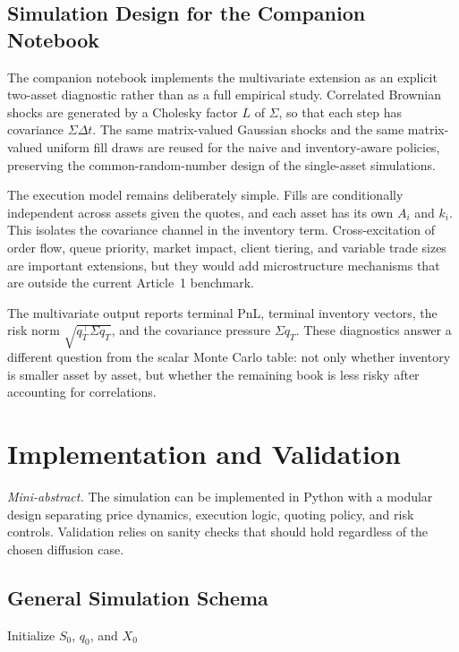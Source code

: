 \documentclass[a4paper,10pt,titlepage,oneside,openany]{book}
\theoremstyle{plain}\newtheorem{theorem}{Theorem}[chapter]
\theoremstyle{definition}\newtheorem{definition}{Definition}[chapter]
\theoremstyle{remark}\newtheorem{remark}{Remark}[chapter]
\newcommand{\miniabstract}[1]{%
\vspace{-2pt}
\begin{tcolorbox}[colback=gray!6,colframe=black!15,boxrule=0.3pt,arc=3pt,left=6pt,right=6pt,top=4pt,bottom=4pt]
\textit{Mini-abstract.} #1
\end{tcolorbox}
\vspace{-4pt}
}
\begin{document}
\section{Simulation Design for the Companion Notebook}
The companion notebook implements the multivariate extension as an explicit two-asset diagnostic rather than as a full empirical study. Correlated Brownian shocks are generated by a Cholesky factor $L$ of $\Sigma$, so that each step has covariance $\Sigma\Delta t$. The same matrix-valued Gaussian shocks and the same matrix-valued uniform fill draws are reused for the naive and inventory-aware policies, preserving the common-random-number design of the single-asset simulations.

The execution model remains deliberately simple. Fills are conditionally independent across assets given the quotes, and each asset has its own $A_i$ and $k_i$. This isolates the covariance channel in the inventory term. Cross-excitation of order flow, queue priority, market impact, client tiering, and variable trade sizes are important extensions, but they would add microstructure mechanisms that are outside the current Article~1 benchmark.

The multivariate output reports terminal PnL, terminal inventory vectors, the risk norm $\sqrt{q_T^\top\Sigma q_T}$, and the covariance pressure $\Sigma q_T$. These diagnostics answer a different question from the scalar Monte Carlo table: not only whether inventory is smaller asset by asset, but whether the remaining book is less risky after accounting for correlations.

\chapter{Implementation and Validation}
\miniabstract{The simulation can be implemented in Python with a modular design separating price dynamics, execution logic, quoting policy, and risk controls. Validation relies on sanity checks that should hold regardless of the chosen diffusion case.}

\section{General Simulation Schema}
\begin{algorithm}[H]
\caption{Event-driven market making simulation}
\DontPrintSemicolon
{}
Initialize $S_0$, $q_0$, and $X_0$\;
\;
\end{algorithm}
\end{document}
